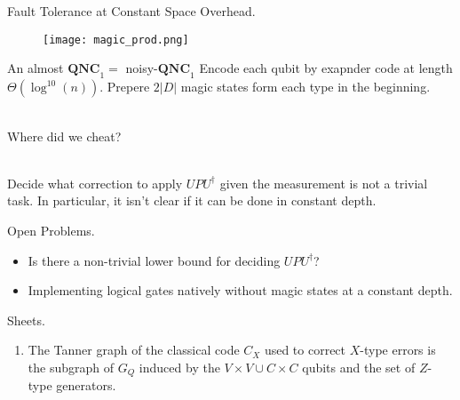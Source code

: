 \documentclass{beamer}
\newcommand*{\QNCon}{ \mathbf{QNC}_{1} }
\newcommand*{\noiseQNCon}{ noisy-$\QNCon$ }
\begin{document}
\begin{frame}{Fault Tolerance at Constant Space Overhead.}
\begin{figure}[h]
    \centering
    \texttt{[image: magic\_prod.png]}
    \label{fig:your-label}
\end{figure}
\end{frame}

\begin{frame}{An almost $\QNCon =$ \noiseQNCon}
  Encode each qubit by exapnder code at length $\Theta(\log^{10}(n))$. Prepere $2|D|$ magic states form each type in the beginning. \\~\ 

Where did we cheat? \\~\

Decide what correction to apply $UPU^{\dagger}$ given the measurement is not a trivial task. In particular, it isn't clear if it can be done in constant depth.
\end{frame}


\begin{frame}{Open Problems.}
  \begin{itemize}
    \item Is there a non-trivial lower bound for deciding $UPU^{\dagger}$?
    \item Implementing logical gates natively without magic states at a constant depth.
  \end{itemize}
\end{frame}


\begin{frame}{Sheets.}
  \begin{enumerate}
    \item The Tanner graph of the classical code $C_{X}$ used to correct $X$-type errors is the subgraph of $G_{Q}$ induced by the $V \times V \cup C \times C$ qubits and the set of $Z$-type generators.  
  \end{enumerate}
\end{frame}
\end{document}
